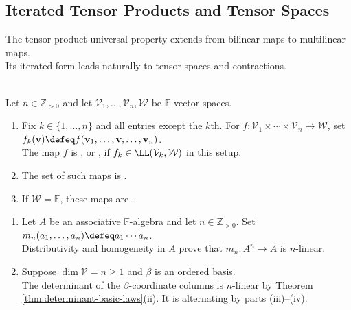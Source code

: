 \subsection{Iterated Tensor Products and Tensor Spaces}

The tensor-product universal property extends from bilinear maps to multilinear maps.\\
Its iterated form leads naturally to tensor spaces and contractions.

\begin{definition} \label{def:multilinear-map} \\
Let $n\in\mathbb{Z}_{>0}$ and let $\mathcal{V}_1,\ldots,\mathcal{V}_n,\mathcal{W}$ be $\mathbb{F}$-vector spaces.
\begin{enumerate}[label=(\roman*)]
\setlength{\itemsep}{0pt}
\item Fix $k\in\{1,\ldots,n\}$ and all entries except the $k$th. For $f:\mathcal{V}_1\times\cdots\times\mathcal{V}_n\to\mathcal{W}$, set $f_k(\mathbf{v})\defeq f(\mathbf{v}_1,\ldots,\mathbf{v},\ldots,\mathbf{v}_n)$.\\
The map $f$ is , or , if $f_k\in\LL(\mathcal{V}_k,\mathcal{W})$ in this setup.
\item The set of such maps is .
\item If $\mathcal{W}=\mathbb{F}$, these maps are .
\end{enumerate}
\end{definition}

\begin{example} \label{ex:basic-multilinear-maps} 
\begin{enumerate}[label=(\roman*)]
\setlength{\itemsep}{0pt}
\item Let $A$ be an associative $\mathbb{F}$-algebra and let $n\in\mathbb{Z}_{>0}$. Set $m_n(a_1,\ldots,a_n)\defeq a_1\cdots a_n$.\\
Distributivity and homogeneity in $A$ prove that $m_n:A^n\to A$ is $n$-linear.
\item Suppose $\dim\mathcal{V}=n\geq1$ and $\beta$ is an ordered basis.\\
The determinant of the $\beta$-coordinate columns is $n$-linear by Theorem \ref{thm:determinant-basic-laws}(ii). It is alternating by parts (iii)--(iv).
\end{enumerate}
\end{example}

